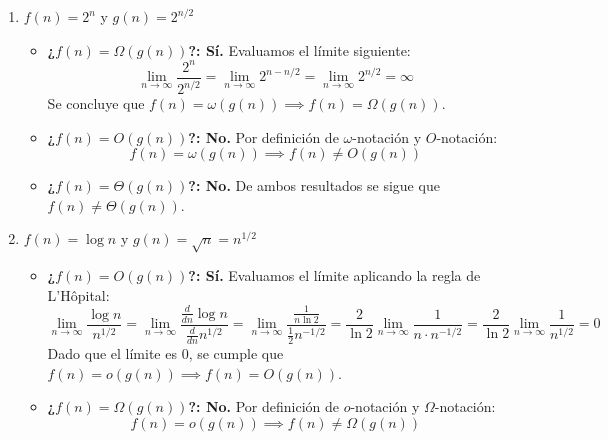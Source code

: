 \begin{enumerate}
\begin{itemize}
        \item \textbf{¿$f(n) = \Omega(g(n))$?: No.}  
        Por definición de $o$-notación y $\Omega$-notación:
        \[
        f(n) = o(g(n)) \implies f(n) \neq \Omega(g(n))
        \]
    
        \item \textbf{¿$f(n) = \Theta(g(n))$?: No.}  
        De ambos resultados se sigue que $f(n) \neq \Theta(g(n))$.
    \end{itemize}

    \item $f(n) = 2^n$ y $g(n) = 2^{n/2}$
    \begin{itemize}

        \item \textbf{¿$f(n) = \Omega(g(n))$?: Sí.}  
        Evaluamos el límite siguiente:
        \[
        \lim_{n \to \infty} \frac{2^n}{2^{n/2}} 
        = \lim_{n \to \infty} 2^{n - n/2} 
        = \lim_{n \to \infty} 2^{n/2} = \infty
        \]
        Se concluye  que $f(n) = \omega(g(n)) \implies f(n) = \Omega(g(n))$.
    
        \item \textbf{¿$f(n) = O(g(n))$?: No.}  
        Por definición de $\omega$-notación y $O$-notación:
        \[
        f(n) = \omega(g(n)) \implies f(n) \neq O(g(n))
        \]
    
        \item \textbf{¿$f(n) = \Theta(g(n))$?: No.}  
        De ambos resultados se sigue que $f(n) \neq \Theta(g(n))$.
    \end{itemize}

    \item $f(n) = \log n$ y $g(n) = \sqrt{n} = n^{1/2}$
    \begin{itemize}
        \item \textbf{¿$f(n) = O(g(n))$?: Sí.}  
        Evaluamos el límite aplicando la regla de L'Hôpital:
        \[
        \lim_{n \to \infty} \frac{\log n}{n^{1/2}} 
        = \lim_{n \to \infty} \frac{\frac{d}{dn} \log n}{\frac{d}{dn} n^{1/2}} 
        = \lim_{n \to \infty} \frac{\frac{1}{n \ln 2}}{\frac{1}{2} n^{-1/2}} 
        = \frac{2}{\ln 2} \lim_{n \to \infty} \frac{1}{n \cdot n^{-1/2}} 
        = \frac{2}{\ln 2} \lim_{n \to \infty} \frac{1}{n^{1/2}} = 0
        \]
        Dado que el límite es $0$, se cumple que $f(n) = o(g(n)) \implies f(n) = O(g(n))$.
    
        \item \textbf{¿$f(n) = \Omega(g(n))$?: No.}  
        Por definición de $o$-notación y $\Omega$-notación:
        \[
        f(n) = o(g(n)) \implies f(n) \neq \Omega(g(n))
        \]
    

\end{itemize}
\end{enumerate}
